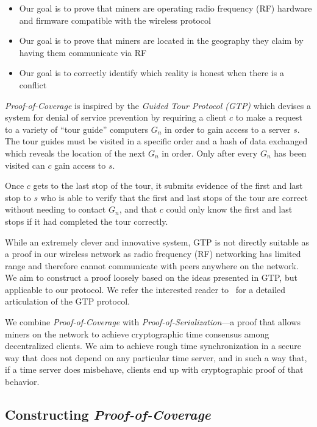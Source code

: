 \documentclass[letterpaper,11pt]{article}
\begin{document}
\begin{itemize}
    \item Our goal is to prove that miners are operating radio frequency (RF) hardware and firmware compatible with the wireless protocol
    \item Our goal is to prove that miners are located in the geography they claim by having them communicate via RF
    \item Our goal is to correctly identify which reality is honest when there is a conflict
\end{itemize}

\emph{Proof-of-Coverage} is inspired by the \emph{Guided Tour Protocol (GTP)} which devises a system for denial of service prevention by requiring a client $c$ to make a request to a variety of ``tour guide'' computers $G_n$ in order to gain access to a server $s$. The tour guides must be visited in a specific order and a hash of data exchanged which reveals the location of the next $G_n$ in order. Only after every $G_n$ has been visited can $c$ gain access to $s$.

Once $c$ gets to the last stop of the tour, it submits evidence of the first and last stop to $s$ who is able to verify that the first and last stops of the tour are correct without needing to contact $G_n$, and that $c$ could only know the first and last stops if it had completed the tour correctly.

While an extremely clever and innovative system, GTP is not directly suitable as a proof in our wireless network as radio frequency (RF) networking has limited range and therefore cannot communicate with peers anywhere on the network. We aim to construct a proof loosely based on the ideas presented in GTP, but applicable to our protocol. We refer the interested reader to~\cite{gtp} for a detailed articulation of the GTP protocol.

We combine \emph{Proof-of-Coverage} with \emph{Proof-of-Serialization}---a proof that allows miners on the network to achieve cryptographic time consensus among decentralized clients. We aim to achieve rough time synchronization in a secure way that does not depend on any particular time server, and in such a way that, if a time server does misbehave, clients end up with cryptographic proof of that behavior.

\subsection{Constructing \emph{Proof-of-Coverage}}
\end{document}
